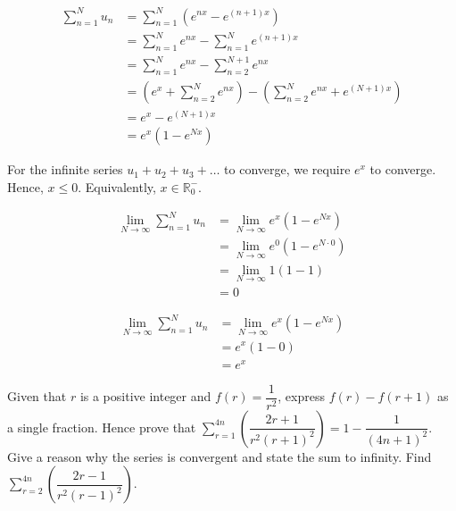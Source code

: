 \documentclass{echw}
\begin{document}
    \solution
        \begin{align*}
            \sum\limits_{n=1}^N u_n &= \sum\limits_{n=1}^N \left(e^{nx} - e^{(n+1)x}\right)\\
            &= \sum_{n=1}^N e^{nx} - \sum_{n=1}^N e^{(n+1)x}\\
            &= \sum_{n=1}^N e^{nx} - \sum_{n=2}^{N+1} e^{nx}\\
            &= \left(e^x + \sum_{n=2}^N e^{nx}\right) - \left(\sum_{n=2}^{N} e^{nx} + e^{(N+1)x}\right)\\
            &= e^x - e^{(N+1)x}\\
            &= e^x(1 - e^{Nx})
        \end{align*}


        For the infinite series $u_1 + u_2 + u_3 + \ldots$ to converge, we require $e^x$ to converge. Hence, $x \leq 0$. Equivalently, $x \in \mathbb{R}^-_0$.


        \begin{align*}
            \lim_{N \rightarrow \infty} \sum\limits_{n=1}^N u_n &= \lim_{N \rightarrow \infty} e^x(1 - e^{Nx}) \\
            &= \lim_{N \rightarrow \infty} e^0(1 - e^{N\cdot0}) \\
            &= \lim_{N \rightarrow \infty} 1(1 - 1) \\
            &= 0
        \end{align*}


        \begin{align*}
            \lim_{N \rightarrow \infty} \sum\limits_{n=1}^N u_n &= \lim_{N \rightarrow \infty} e^x(1 - e^{Nx}) \\
            &= e^x(1 - 0)\\
            &= e^x
        \end{align*}


    \problem{}
        Given that $r$ is a positive integer and $f(r) = \dfrac1{r^2}$, express $f(r) - f(r+1)$ as a single fraction. Hence prove that $\sum\limits_{r=1}^{4n} \left(\dfrac{2r+1}{r^2(r+1)^2}\right) = 1 - \dfrac1{(4n+1)^2}$. Give a reason why the series is convergent and state the sum to infinity. Find $\sum\limits_{r=2}^{4n} \left(\dfrac{2r-1}{r^2(r-1)^2}\right)$.
\end{document}
